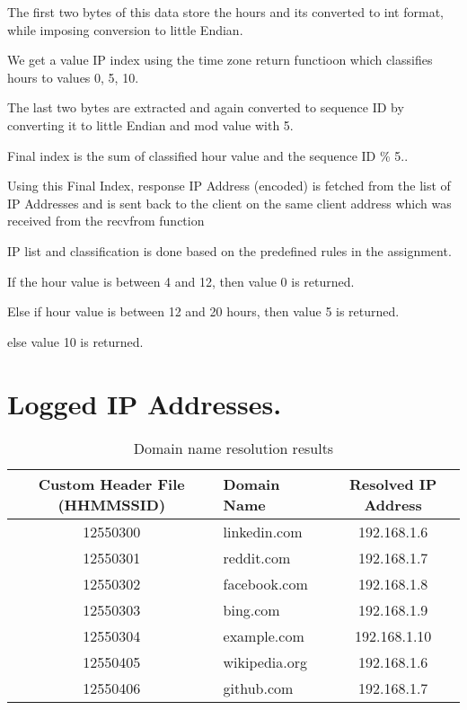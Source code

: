 \documentclass[12pt, a4paper]{report}
\begin{document}
The first two bytes of this data store the hours and its converted to int format, while imposing conversion to little Endian.

We get a value IP index using the time zone return functioon which classifies hours to values 0, 5, 10.

The last two bytes are extracted and again converted to sequence ID by converting it to little Endian and mod value with 5.

Final index is the sum of classified hour value and the sequence ID \% 5..

Using this Final Index, response IP Address (encoded) is fetched from the list of IP Addresses and is sent back to the client on the same client address which was received from the recvfrom function

IP list and classification is done based on the predefined rules in the assignment.

If the hour value is between 4 and 12, then value 0 is returned.

Else if hour value is between 12 and 20 hours, then value 5 is returned.

else value 10 is returned.

\section{Logged IP Addresses.}

\begin{table}[h!]
\centering
\begin{tabular}{|c|l|c|}
\hline
\textbf{Custom Header File (HHMMSSID)} & \textbf{Domain Name} & \textbf{Resolved IP Address} \\ \hline
12550300 & linkedin.com   & 192.168.1.6  \\ \hline
12550301 & reddit.com     & 192.168.1.7  \\ \hline
12550302 & facebook.com   & 192.168.1.8  \\ \hline
12550303 & bing.com       & 192.168.1.9  \\ \hline
12550304 & example.com    & 192.168.1.10 \\ \hline
12550405 & wikipedia.org  & 192.168.1.6  \\ \hline
12550406 & github.com     & 192.168.1.7  \\ \hline
\end{tabular}
\caption{Domain name resolution results}
\label{tab:dns-results}
\end{table}
\end{document}
